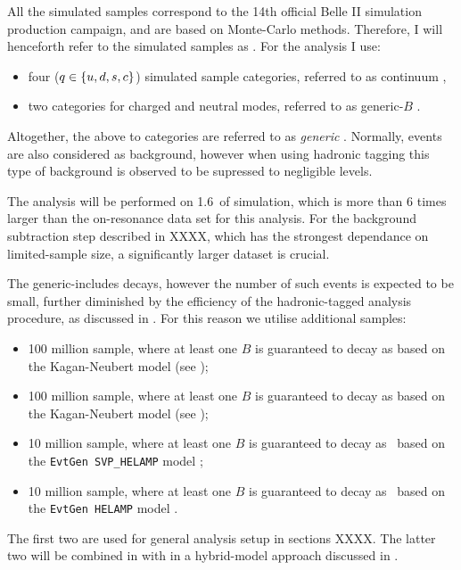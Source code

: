 All the simulated samples correspond to the 14th official Belle II simulation production campaign, and are based on Monte-Carlo methods.
Therefore, I will henceforth refer to the simulated samples as \MC.
For the analysis I use:
\begin{itemize}
    \item four \epem\ra\qqbar ($q\in\{u,d,s,c\}$) simulated sample categories, referred to as continuum \MC,
    \item two \FourS\ra\BB categories for charged and neutral \B modes, referred to as generic-$B$ \MC.
\end{itemize}
Altogether, the above to categories are referred to as \textit{generic} \MC.
Normally, \epem\ra\tautau events are also considered as background, however when using hadronic tagging this type of background is observed to be supressed to negligible levels.

The analysis will be performed on 1.6~\invab of simulation, which is more than 6 times larger than the on-resonance data set for this analysis.
For the background subtraction step described in XXXX, which has the strongest dependance on limited-\MC sample size, a significantly larger dataset is crucial.

The generic-\B \MC includes \BtoXsgamma decays, however the number of such events is expected to be small, further diminished by the efficiency of the hadronic-tagged analysis procedure, as discussed in .
For this reason we utilise additional samples:
\begin{itemize}
    \item 100 million \BpBm sample, where at least one $B$ is guaranteed to decay as \BptoXsgamma based on the Kagan-Neubert model \cite{Kagan:1998ym} (see );
    \item 100 million \BzBzb sample, where at least one $B$ is guaranteed to decay as \BztoXsgamma based on the Kagan-Neubert model \cite{Kagan:1998ym} (see );
    \item 10 million \BpBm sample, where at least one $B$ is guaranteed to decay as \Bpm\ra\Kstarpm\gamma~based on the \texttt{EvtGen SVP\_HELAMP} model \cite{Ryd:2005zz};
    \item 10 million \BzBzb sample, where at least one $B$ is guaranteed to decay as \Bz\ra\Kstarz\gamma~based on the \texttt{EvtGen HELAMP} model \cite{Ryd:2005zz}.
\end{itemize}
The first two are used for general analysis setup in sections XXXX.
The latter two will be combined in with \BtoXsgamma in a hybrid-model approach \cite{Ramirez:1989yk} discussed in .

